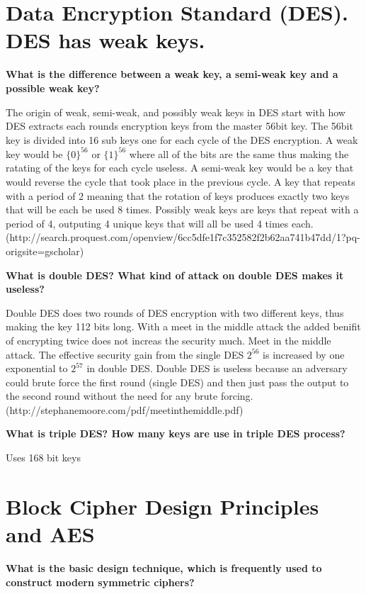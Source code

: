 \documentclass[letterpaper,11pt,notitlepage,fleqn]{article}
\begin{document}
\section{Data Encryption Standard (DES). DES has weak keys.}
\noindent \textbf{What is the difference between a weak key, a semi-weak key and a possible weak key?}

The origin of weak, semi-weak, and possibly weak keys in DES start with how DES extracts each rounds encryption keys from the master 56bit key. The 56bit key is divided into 16 sub keys one for each cycle of the DES encryption. A weak key would be $\lbrace0\rbrace^{56}$ or $\lbrace1\rbrace^{56}$ where all of the bits are the same thus making the ratating of the keys for each cycle useless. A semi-weak key would be a key that would reverse the cycle that took place in the previous cycle. A
key that repeats with a period of 2 meaning that the rotation of keys produces exactly two keys that will be each be used 8 times. Possibly weak keys are keys that repeat with a period of 4, outputing 4 unique keys that will all be used 4 times each. (http://search.proquest.com/openview/6cc5dfe1f7c352582f2b62aa741b47dd/1?pq-origsite=gscholar) 

\noindent \textbf{What is double DES?  What kind of attack on double DES makes it useless?}

Double DES does two rounds of DES encryption with two different keys, thus making the key 112 bits long. With a meet in the middle attack the added benifit of encrypting twice does not increas the security much. 
Meet in the middle attack. The effective security gain from the single DES $2^{56}$ is increased by one exponential to $2^{57}$ in double DES. Double DES is useless because an adversary could brute force the first round (single DES) and then just pass the output to the second round without the need for any brute forcing. (http://stephanemoore.com/pdf/meetinthemiddle.pdf)

\noindent \textbf{What is triple DES?  How many keys are use in triple DES process?}

Uses 168 bit keys



\section{Block Cipher Design Principles and AES}
\noindent \textbf{What is the basic design  technique,  which  is  frequently  used  to  construct  modern symmetric ciphers?}
\end{document}

